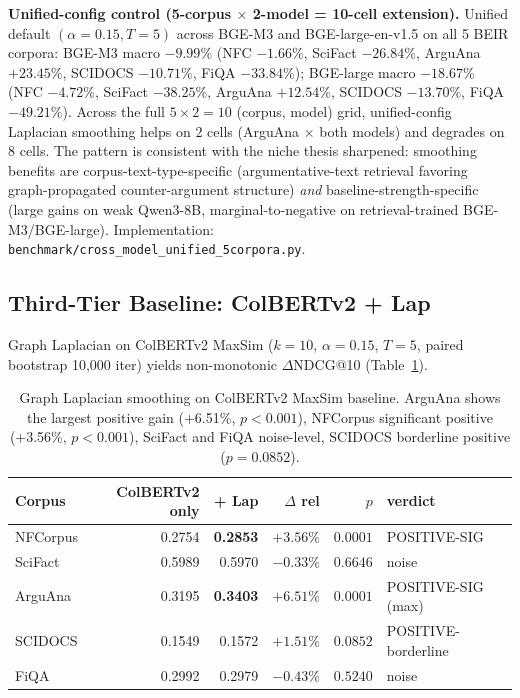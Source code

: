 \documentclass[review,1p]{elsarticle}
\begin{document}
\textbf{Unified-config control (5-corpus $\times$ 2-model = 10-cell extension).} Unified default $(\alpha=0.15, T=5)$ across BGE-M3 and BGE-large-en-v1.5 on all 5 BEIR corpora: BGE-M3 macro $-9.99\%$ (NFC $-1.66\%$, SciFact $-26.84\%$, ArguAna $+23.45\%$, SCIDOCS $-10.71\%$, FiQA $-33.84\%$); BGE-large macro $-18.67\%$ (NFC $-4.72\%$, SciFact $-38.25\%$, ArguAna $+12.54\%$, SCIDOCS $-13.70\%$, FiQA $-49.21\%$). Across the full $5 \times 2 = 10$ (corpus, model) grid, unified-config Laplacian smoothing helps on 2 cells (ArguAna $\times$ both models) and degrades on 8 cells. The pattern is consistent with the niche thesis sharpened: smoothing benefits are corpus-text-type-specific (argumentative-text retrieval favoring graph-propagated counter-argument structure) \emph{and} baseline-strength-specific (large gains on weak Qwen3-8B, marginal-to-negative on retrieval-trained BGE-M3/BGE-large). Implementation: \texttt{benchmark/cross\_model\_unified\_5corpora.py}.

\subsection{Third-Tier Baseline: ColBERTv2 + Lap}
\label{subsec:colbertv2-lap}

Graph Laplacian on ColBERTv2 MaxSim ($k=10$, $\alpha=0.15$, $T=5$, paired bootstrap 10{,}000 iter) yields non-monotonic $\Delta$NDCG@10 (Table~\ref{tab:colbertv2-lap}).

\begin{table}[ht]
\centering
\small
\caption{Graph Laplacian smoothing on ColBERTv2 MaxSim baseline. ArguAna shows the largest positive gain (+6.51\%, $p<0.001$), NFCorpus significant positive (+3.56\%, $p<0.001$), SciFact and FiQA noise-level, SCIDOCS borderline positive ($p=0.0852$).}
\label{tab:colbertv2-lap}
\begin{tabular}{lrrrrl}
\toprule
Corpus & ColBERTv2 only & + Lap & $\Delta$ rel & $p$ & verdict \\
\midrule
NFCorpus & 0.2754 & \textbf{0.2853} & $+3.56\%$ & $0.0001$ & POSITIVE-SIG \\
SciFact & 0.5989 & 0.5970 & $-0.33\%$ & $0.6646$ & noise \\
ArguAna & 0.3195 & \textbf{0.3403} & $+6.51\%$ & $0.0001$ & POSITIVE-SIG (max) \\
SCIDOCS & 0.1549 & 0.1572 & $+1.51\%$ & $0.0852$ & POSITIVE-borderline \\
FiQA & 0.2992 & 0.2979 & $-0.43\%$ & $0.5240$ & noise \\
\bottomrule
\end{tabular}
\end{table}
\end{document}
